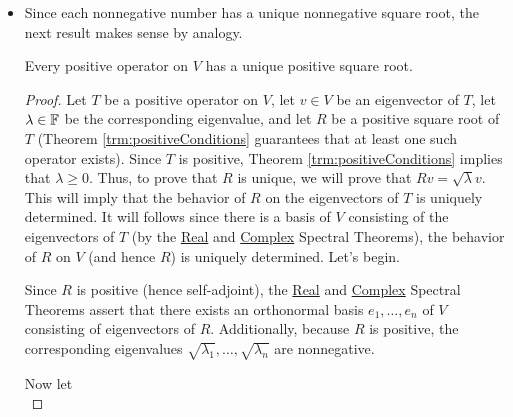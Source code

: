 \documentclass[../main.tex]{subfiles}
\begin{document}
\begin{itemize}
\begin{theorem}
\begin{proof}
            Fifth, suppose that there exists an operator $R\in\ope{V}$ such that $T=R^*R$. To prove that $T$ is positive, it will suffice to show that it is self-adjoint and that $\inp{Tv}{v}\geq 0$ for all $v\in V$. First off, $T$ is self-adjoint since
            \begin{equation*}
                T^* = (R^*R)^* = R^*(R^*)^* = R^*R = T
            \end{equation*}
            Second, we have that
            \begin{equation*}
                \inp{Tv}{v} = \inp{R^*Rv}{v} = \inp{Rv}{Rv} \geq 0
            \end{equation*}
            for all $v\in V$. Therefore, $T$ is positive, as desired.
        \end{proof}
    \end{theorem}
    \item Since each nonnegative number has a unique nonnegative square root, the next result makes sense by analogy.
    \begin{theorem}\label{trm:posSquareRoot}
        Every positive operator on $V$ has a unique positive square root.
        \begin{proof}
            Let $T$ be a positive operator on $V$, let $v\in V$ be an eigenvector of $T$, let $\lambda\in\mathbb{F}$ be the corresponding eigenvalue, and let $R$ be a positive square root of $T$ (Theorem \ref{trm:positiveConditions} guarantees that at least one such operator exists). Since $T$ is positive, Theorem \ref{trm:positiveConditions} implies that $\lambda\geq 0$. Thus, to prove that $R$ is unique, we will prove that $Rv=\sqrt{\lambda}v$. This will imply that the behavior of $R$ on the eigenvectors of $T$ is uniquely determined. It will follows since there is a basis of $V$ consisting of the eigenvectors of $T$ (by the \hyperref[trm:RealSpectral]{Real} and \hyperref[trm:ComplexSpectral]{Complex} Spectral Theorems), the behavior of $R$ on $V$ (and hence $R$) is uniquely determined. Let's begin.\par\smallskip
            Since $R$ is positive (hence self-adjoint), the \hyperref[trm:RealSpectral]{Real} and \hyperref[trm:ComplexSpectral]{Complex} Spectral Theorems assert that there exists an orthonormal basis $e_1,\dots,e_n$ of $V$ consisting of eigenvectors of $R$. Additionally, because $R$ is positive, the corresponding eigenvalues $\sqrt{\lambda_1},\dots,\sqrt{\lambda_n}$ are nonnegative.\par
            Now let
            \begin{equation*}

\end{equation*}
\end{proof}
\end{theorem}
\end{itemize}
\end{document}
